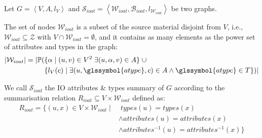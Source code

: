 \begin{definition}
	Let $G=\left\langle V, A, l_V \right\rangle$ and $\mathcal{S}_{ioat} = \left\langle \mathcal{W}_{ioat}, \mathcal{B}_{ioat}, l_{\mathcal{W}_{ioat}} \right\rangle$ be two graphs.

	The set of nodes $\mathcal{W}_{ioat}$ is a subset of the source material disjoint from $V$, i.e., $\mathcal{W}_{ioat} \subseteq \mathcal{Z}$ with $V \cap \mathcal{W}_{ioat} = \emptyset$, and it contains as many elements as the power set of attributes and types in the graph:
	$$
	\begin{aligned}
	\lvert \mathcal{W}_{ioat} \rvert = \lvert \mathbb{P} ( & \{ \alpha \mid (u, v) \in V^2\; \exists (u, \alpha, v) \in A \} \;\cup \\
	& \{ l_V(c) \mid \exists (u, \glssymbol{atype}, c) \in A \wedge \glssymbol{atype} \in T \} ) \rvert
	\end{aligned}
	$$

	We call $\mathcal{S}_{ioat}$ the IO attributes \& types summary of $G$ according to the summarisation relation $R_{ioat} \subseteq V \times \mathcal{W}_{ioat}$ defined as:
	$$
	\begin{aligned}
	R_{ioat} = \{ (u, x) \in V \times \mathcal{W}_{ioat} \mid &\; types(u) = types(x) \\
	& \wedge attributes(u) = attributes(x) \\
	& \wedge attributes^{-1}(u) = attributes^{-1}(x) \}
	\end{aligned}
	$$
	\label{def:ioat}
\end{definition}
\vspace{.5cm}

